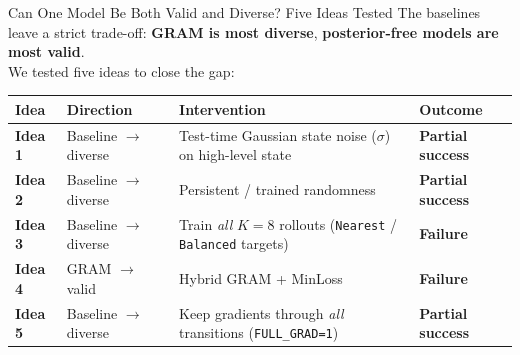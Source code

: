 \documentclass[aspectratio=169,10pt]{beamer}
\begin{document}
\begin{frame}{Can One Model Be Both Valid and Diverse? Five Ideas Tested}
  \small
  The baselines leave a strict trade-off: \textbf{GRAM is most diverse}, \textbf{posterior-free models are most valid}.\\
  We tested five ideas to close the gap:
  {\renewcommand{\arraystretch}{1.18}%
  \centering
  \footnotesize
  \begin{tabular}{@{}ll>{\raggedright\arraybackslash}p{7.2cm}l@{}}
    \toprule
    \textbf{Idea} & \textbf{Direction} & \textbf{Intervention} & \textbf{Outcome} \\
    \midrule
    \textbf{Idea 1} & Baseline $\to$ diverse & Test-time Gaussian state noise ($\sigma$) on high-level state & \textcolor{accentamber}{\textbf{Partial success}} \\
    \textbf{Idea 2} & Baseline $\to$ diverse & Persistent / trained randomness & \textcolor{accentamber}{\textbf{Partial success}} \\
    \textbf{Idea 3} & Baseline $\to$ diverse & Train \emph{all} $K=8$ rollouts (\texttt{Nearest} / \texttt{Balanced} targets) & \textcolor{accentred}{\textbf{Failure}} \\
    \textbf{Idea 4} & GRAM $\to$ valid & Hybrid GRAM + MinLoss & \textcolor{accentred}{\textbf{Failure}} \\
    \textbf{Idea 5} & Baseline $\to$ diverse & Keep gradients through \emph{all} transitions (\texttt{FULL\_GRAD=1}) & \textcolor{accentamber}{\textbf{Partial success}} \\
    \bottomrule
  \end{tabular}}
\end{frame}


\end{document}
